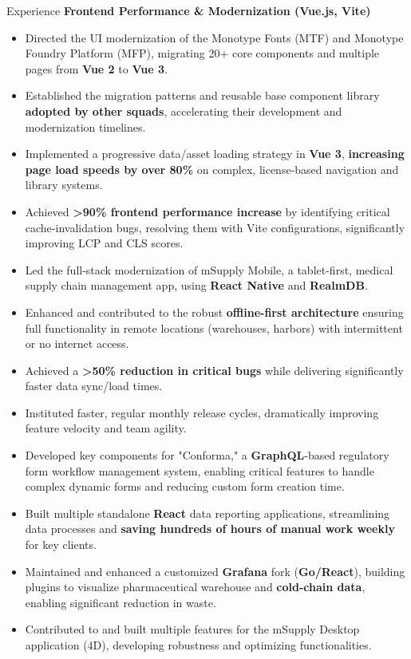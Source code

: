 \documentclass{resume} %
\begin{document}
\begin{rSection}{Experience}
\vspace{5pt}
\noindent\textbf{Frontend Performance \& Modernization (Vue.js, Vite)}
\begin{itemize}
    \item Directed the UI modernization of the Monotype Fonts (MTF) and Monotype Foundry Platform (MFP), migrating 20+ core components and multiple pages from \textbf{Vue 2} to \textbf{Vue 3}.
    \item Established the migration patterns and reusable base component library \textbf{adopted by other squads}, accelerating their development and modernization timelines.
    \item Implemented a progressive data/asset loading strategy in \textbf{Vue 3}, \textbf{increasing page load speeds by over 80\%} on complex, license-based navigation and library systems.
    \item Achieved \textbf{>90\% frontend performance increase} by identifying critical cache-invalidation bugs, resolving them with Vite configurations, significantly improving LCP and CLS scores.
\end{itemize}
 
\begin{itemize}
    \item Led the full-stack modernization of mSupply Mobile, a tablet-first, medical supply chain management app, using \textbf{React Native} and \textbf{RealmDB}.
    \item Enhanced and contributed to the robust \textbf{offline-first architecture} ensuring full functionality in remote locations (warehouses, harbors) with intermittent or no internet access.
    \item Achieved a \textbf{>50\% reduction in critical bugs} while delivering significantly faster data sync/load times.
    \item Instituted faster, regular monthly release cycles, dramatically improving feature velocity and team agility.
    \item Developed key components for "Conforma," a \textbf{GraphQL}-based regulatory form workflow management system, enabling critical features to handle complex dynamic forms and reducing custom form creation time.
    \item Built multiple standalone \textbf{React} data reporting applications, streamlining data processes and \textbf{saving hundreds of hours of manual work weekly} for key clients.
    \item Maintained and enhanced a customized \textbf{Grafana} fork (\textbf{Go/React}), building plugins to visualize pharmaceutical warehouse and \textbf{cold-chain data}, enabling significant reduction in waste.
    \item Contributed to and built multiple features for the mSupply Desktop application (4D), developing robustness and optimizing functionalities.
\end{itemize}


\end{rSection}
\end{document}
